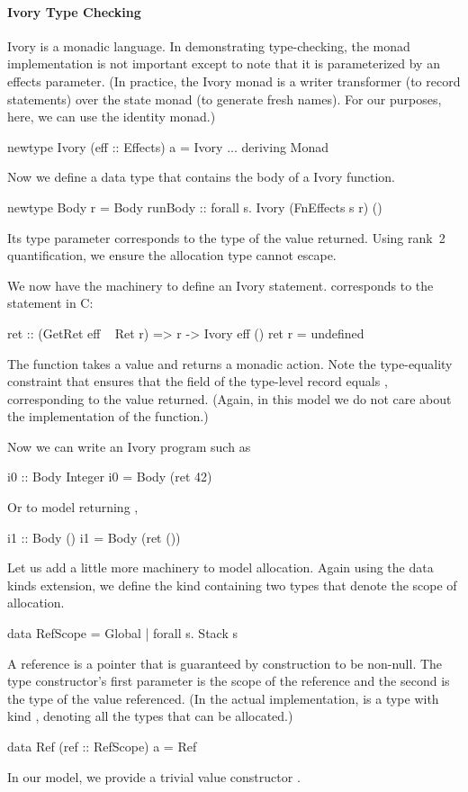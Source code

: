 \paragraph{Ivory Type Checking}
Ivory is a monadic language.  In demonstrating type-checking, the monad
implementation is not important except to note that it is parameterized by an
effects parameter.  (In practice, the Ivory monad is a writer transformer (to
record statements) over the state monad (to generate fresh names).  For our
purposes, here, we can use the identity monad.)
\begin{code}
newtype Ivory (eff :: Effects) a = Ivory ...
  deriving Monad
\end{code}
\noindent
Now we define a data type  that contains the body of a Ivory
function.
\begin{code}
newtype Body r = Body
  { runBody :: forall s. Ivory (FnEffects s r) () }
\end{code}
\noindent
Its type parameter corresponds to the type of the value returned.  Using rank~2
quantification, we ensure the allocation type cannot escape.

We now have the machinery to define an Ivory statement.   corresponds to
the  statement in C:
\begin{code}
ret :: (GetRet eff ~ Ret r) => r -> Ivory eff ()
ret r = undefined
\end{code}
\noindent
The function  takes a value and returns a monadic action.  Note the
type-equality constraint that ensures that the  field of the type-level
record equals , corresponding to the value returned.  (Again, in this
model we do not care about the implementation of the function.)

Now we can write an Ivory program such as
\begin{code}
i0 :: Body Integer
i0 = Body (ret 42)
\end{code}
\noindent
Or to model returning ,
\begin{code}
i1 :: Body ()
i1 = Body (ret ())
\end{code}

Let us add a little more machinery to model allocation.  Again using the data
kinds extension, we define the kind  containing two types that
denote the scope of allocation.
\begin{code}
data RefScope
  = Global
  | forall s. Stack s
\end{code}
\noindent
A reference is a pointer that is guaranteed by construction to be non-null.  The
type constructor's first parameter is the scope of the reference and the second
is the type of the value referenced.  (In the actual implementation,  is a
type with kind , denoting all the types that can be allocated.)
\begin{code}
data Ref (ref :: RefScope) a = Ref
\end{code}
\noindent
In our model, we provide a trivial value constructor .


